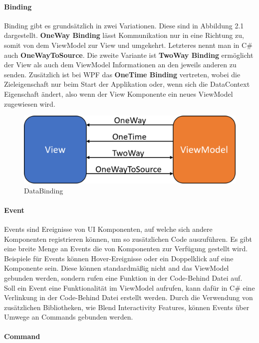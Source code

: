 \documentclass[titlepage=false,12pt]{scrreprt}
\begin{document}
\paragraph{Binding}

Binding gibt es grundsätzlich in zwei Variationen. Diese sind in Abbildung 2.1 dargestellt. \textbf{OneWay Binding}
lässt Kommunikation nur in eine Richtung zu, somit von dem ViewModel zur View und umgekehrt.
Letzteres nennt man in C\# auch \textbf{OneWayToSource}. Die zweite Variante ist \textbf{TwoWay Binding} ermöglicht
der View als auch dem ViewModel Informationen an den jeweils anderen zu senden. Zusätzlich ist 
bei WPF das \textbf{OneTime Binding} vertreten, wobei die Zieleigenschaft nur beim Start der Applikation 
oder, wenn sich die DataContext Eigenschaft ändert, also wenn der View Komponente ein neues 
ViewModel zugewiesen wird.

\begin{figure}[h]
	\includegraphics[width=\textwidth]{Wpf_Binding.png}
	\caption[]{DataBinding}
\end{figure}


\paragraph{Event}

Events sind Ereignisse von UI Komponenten, auf welche sich andere Komponenten registrieren 
können, um so zusätzlichen Code auszuführen. Es gibt eine breite Menge an Events die
von Komponenten zur Verfügung gestellt wird. Beispiele für Events können Hover-Ereignisse
oder ein Doppelklick auf eine Komponente sein.
Diese können standardmäßig nicht and das ViewModel
gebunden werden, sondern rufen eine Funktion in der Code-Behind Datei auf.
Soll ein Event eine Funktionalität im ViewModel aufrufen, kann dafür in C\# eine Verlinkung in der
Code-Behind Datei erstellt werden. Durch die Verwendung von zusätzlichen Bibliotheken, wie
Blend Interactivity Features, können Events über Umwege an Commands gebunden werden.

\paragraph{Command}
\end{document}
